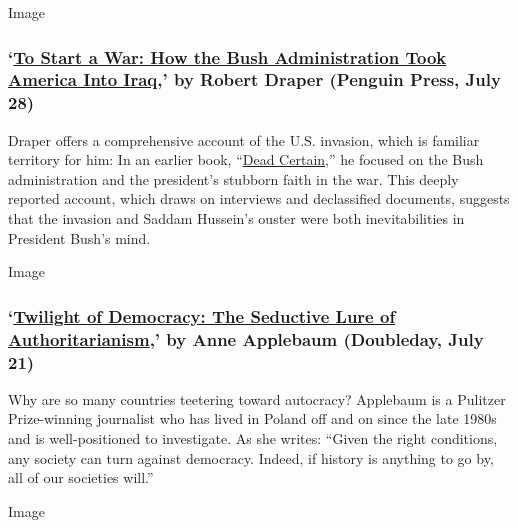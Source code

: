 Image

\hypertarget{to-start-a-war-how-the-bush-administration-took-america-into-iraq-by-robert-draper-penguin-press-july-28}{%
\subsubsection{\texorpdfstring{`\href{https://www.penguinrandomhouse.com/books/592622/to-start-a-war-by-robert-draper/}{To
Start a War: How the Bush Administration Took America Into Iraq},' by
Robert Draper (Penguin Press, July
28)}{`To Start a War: How the Bush Administration Took America Into Iraq,' by Robert Draper (Penguin Press, July 28)}}\label{to-start-a-war-how-the-bush-administration-took-america-into-iraq-by-robert-draper-penguin-press-july-28}}

Draper offers a comprehensive account of the U.S. invasion, which is
familiar territory for him: In an earlier book,
``\href{https://www.nytimes.com/2007/11/04/books/review/Lewis3-t.html}{Dead
Certain},'' he focused on the Bush administration and the president's
stubborn faith in the war. This deeply reported account, which draws on
interviews and declassified documents, suggests that the invasion and
Saddam Hussein's ouster were both inevitabilities in President Bush's
mind.

Image

\hypertarget{twilight-of-democracy-the-seductive-lure-of-authoritarianism-by-anne-applebaum-doubleday-july-21}{%
\subsubsection{\texorpdfstring{`\href{https://www.penguinrandomhouse.com/books/621076/twilight-of-democracy-by-anne-applebaum/}{Twilight
of Democracy: The Seductive Lure of Authoritarianism},' by Anne
Applebaum (Doubleday, July
21)}{`Twilight of Democracy: The Seductive Lure of Authoritarianism,' by Anne Applebaum (Doubleday, July 21)}}\label{twilight-of-democracy-the-seductive-lure-of-authoritarianism-by-anne-applebaum-doubleday-july-21}}

Why are so many countries teetering toward autocracy? Applebaum is a
Pulitzer Prize-winning journalist who has lived in Poland off and on
since the late 1980s and is well-positioned to investigate. As she
writes: ``Given the right conditions, any society can turn against
democracy. Indeed, if history is anything to go by, all of our societies
will.''

Image

